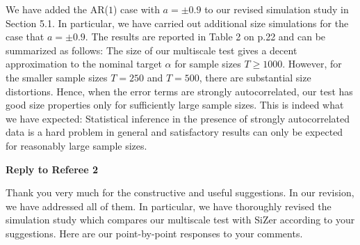 \documentclass[a4paper,12pt]{article}
\begin{document}
\begin{enumerate}[label=(\arabic*),leftmargin=0.7cm]
We have added the AR($1$) case with $a = \pm 0.9$ to our revised simulation study in Section 5.1. In particular, we have carried out additional size simulations for the case that $a = \pm 0.9$. The results are reported in Table 2 on p.22 and can be summarized as follows: The size of our multiscale test gives a decent approximation to the nominal target $\alpha$ for sample sizes $T \ge 1000$. However, for the smaller sample sizes $T=250$ and $T=500$, there are substantial size distortions. Hence, when the error terms are strongly autocorrelated, our test has good size properties only for sufficiently large sample sizes. This is indeed what we have expected: Statistical inference in the presence of strongly autocorrelated data is a hard problem in general and satisfactory results can only be expected for reasonably large sample sizes.

\end{enumerate}



\newpage
\begin{center}
{\large \bf Reply to Referee 2} 
\end{center}


Thank you very much for the constructive and useful suggestions. In our revision, we have addressed all of them. In particular, we have thoroughly revised the simulation study which compares our multiscale test with SiZer according to your suggestions. Here are our point-by-point responses to your comments. 
\end{document}
